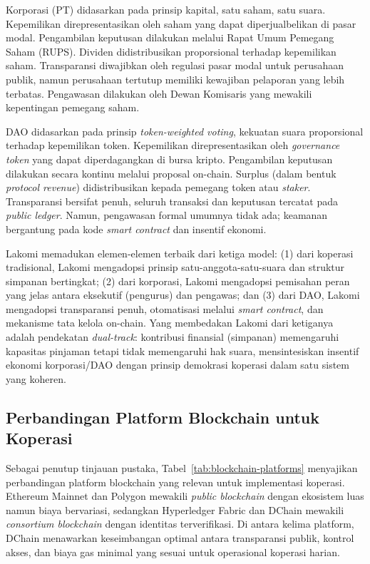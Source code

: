 Korporasi (PT) didasarkan pada prinsip kapital, satu saham, satu suara. Kepemilikan direpresentasikan oleh saham yang dapat diperjualbelikan di pasar modal. Pengambilan keputusan dilakukan melalui Rapat Umum Pemegang Saham (RUPS). Dividen didistribusikan proporsional terhadap kepemilikan saham. Transparansi diwajibkan oleh regulasi pasar modal untuk perusahaan publik, namun perusahaan tertutup memiliki kewajiban pelaporan yang lebih terbatas. Pengawasan dilakukan oleh Dewan Komisaris yang mewakili kepentingan pemegang saham.

DAO didasarkan pada prinsip \textit{token-weighted voting}, kekuatan suara proporsional terhadap kepemilikan token. Kepemilikan direpresentasikan oleh \textit{governance token} yang dapat diperdagangkan di bursa kripto. Pengambilan keputusan dilakukan secara kontinu melalui proposal on-chain. Surplus (dalam bentuk \textit{protocol revenue}) didistribusikan kepada pemegang token atau \textit{staker}. Transparansi bersifat penuh, seluruh transaksi dan keputusan tercatat pada \textit{public ledger}. Namun, pengawasan formal umumnya tidak ada; keamanan bergantung pada kode \textit{smart contract} dan insentif ekonomi.

Lakomi memadukan elemen-elemen terbaik dari ketiga model: (1) dari koperasi tradisional, Lakomi mengadopsi prinsip satu-anggota-satu-suara dan struktur simpanan bertingkat; (2) dari korporasi, Lakomi mengadopsi pemisahan peran yang jelas antara eksekutif (pengurus) dan pengawas; dan (3) dari DAO, Lakomi mengadopsi transparansi penuh, otomatisasi melalui \textit{smart contract}, dan mekanisme tata kelola on-chain. Yang membedakan Lakomi dari ketiganya adalah pendekatan \textit{dual-track}: kontribusi finansial (simpanan) memengaruhi kapasitas pinjaman tetapi tidak memengaruhi hak suara, mensintesiskan insentif ekonomi korporasi/DAO dengan prinsip demokrasi koperasi dalam satu sistem yang koheren.

\subsection{Perbandingan Platform Blockchain untuk Koperasi}

Sebagai penutup tinjauan pustaka, Tabel~\ref{tab:blockchain-platforms} menyajikan perbandingan platform blockchain yang relevan untuk implementasi koperasi. Ethereum Mainnet dan Polygon mewakili \textit{public blockchain} dengan ekosistem luas namun biaya bervariasi, sedangkan Hyperledger Fabric dan DChain mewakili \textit{consortium blockchain} dengan identitas terverifikasi. Di antara kelima platform, DChain menawarkan keseimbangan optimal antara transparansi publik, kontrol akses, dan biaya gas minimal yang sesuai untuk operasional koperasi harian.

